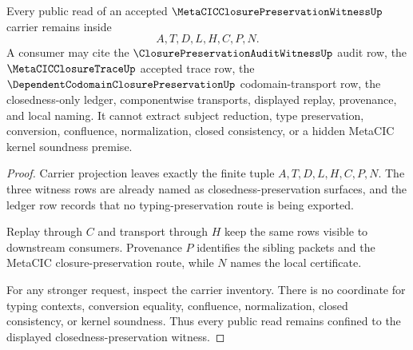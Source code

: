 \begin{theorem}
\label{thm:metacic-closure-preservation-witness-nonescape}
Every public read of an accepted $\MetaCICClosurePreservationWitnessUp$ carrier remains inside
$$
A,T,D,L,H,C,P,N.
$$
A consumer may cite the $\ClosurePreservationAuditWitnessUp$ audit row, the $\MetaCICClosureTraceUp$ accepted trace row, the $\DependentCodomainClosurePreservationUp$ codomain-transport row, the closedness-only ledger, componentwise transports, displayed replay, provenance, and local naming. It cannot extract subject reduction, type preservation, conversion, confluence, normalization, closed consistency, or a hidden MetaCIC kernel soundness premise.
\end{theorem}
\begin{proof}
Carrier projection leaves exactly the finite tuple $A,T,D,L,H,C,P,N$. The three witness rows are already named as closedness-preservation surfaces, and the ledger row records that no typing-preservation route is being exported.

Replay through $C$ and transport through $H$ keep the same rows visible to downstream consumers. Provenance $P$ identifies the sibling packets and the MetaCIC closure-preservation route, while $N$ names the local certificate.

For any stronger request, inspect the carrier inventory. There is no coordinate for typing contexts, conversion equality, confluence, normalization, closed consistency, or kernel soundness. Thus every public read remains confined to the displayed closedness-preservation witness.
\end{proof}


\begin{closurestatus}{\MetaCICClosurePreservationWitnessUp}
  \theoryclosure{\seedClosure}
  \formalstatus{\unformalizedV}
\end{closurestatus}
